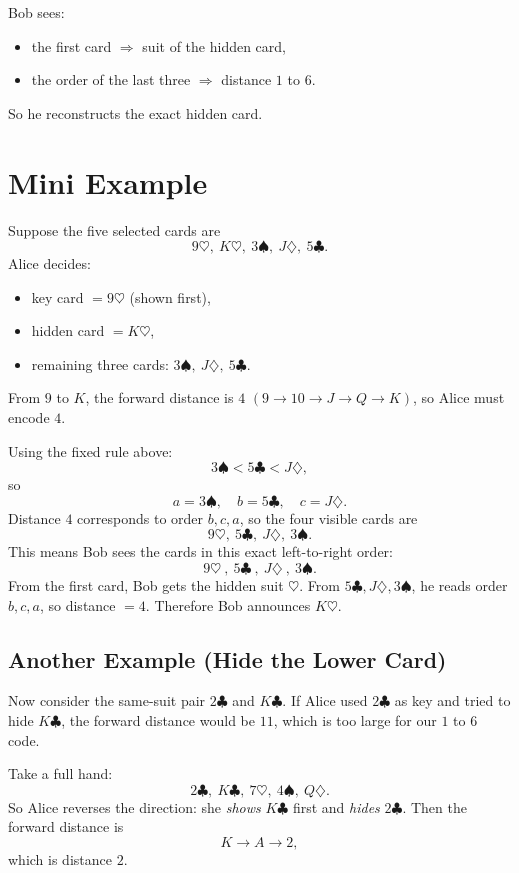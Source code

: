 Bob sees:
\begin{itemize}
  \item the first card \(\Rightarrow\) suit of the hidden card,
  \item the order of the last three \(\Rightarrow\) distance \(1\) to \(6\).
\end{itemize}
So he reconstructs the exact hidden card.

\section{Mini Example}
Suppose the five selected cards are
\[
9\heartsuit,\ K\heartsuit,\ 3\spadesuit,\ J\diamondsuit,\ 5\clubsuit.
\]
Alice decides:
\begin{itemize}
  \item key card \(=9\heartsuit\) (shown first),
  \item hidden card \(=K\heartsuit\),
  \item remaining three cards: \(3\spadesuit,\ J\diamondsuit,\ 5\clubsuit\).
\end{itemize}

From \(9\) to \(K\), the forward distance is \(4\)
\((9\to10\to J\to Q\to K)\), so Alice must encode \(4\).

Using the fixed rule above:
\[
3\spadesuit < 5\clubsuit < J\diamondsuit,
\]
so
\[
a=3\spadesuit,\quad b=5\clubsuit,\quad c=J\diamondsuit.
\]
Distance \(4\) corresponds to order \(b,c,a\), so the four visible cards are
\[
9\heartsuit,\ 5\clubsuit,\ J\diamondsuit,\ 3\spadesuit.
\]
This means Bob sees the cards in this exact left-to-right order:
\[
\boxed{9\heartsuit}\ ,\ \boxed{5\clubsuit}\ ,\ \boxed{J\diamondsuit}\ ,\ \boxed{3\spadesuit}.
\]
From the first card, Bob gets the hidden suit \(\heartsuit\). From
\(5\clubsuit,J\diamondsuit,3\spadesuit\), he reads order \(b,c,a\), so distance
\(=4\). Therefore Bob announces \(K\heartsuit\).

\subsection*{Another Example (Hide the Lower Card)}
Now consider the same-suit pair \(2\clubsuit\) and \(K\clubsuit\). If Alice used
\(2\clubsuit\) as key and tried to hide \(K\clubsuit\), the forward distance
would be \(11\), which is too large for our \(1\) to \(6\) code.

Take a full hand:
\[
2\clubsuit,\ K\clubsuit,\ 7\heartsuit,\ 4\spadesuit,\ Q\diamondsuit.
\]
So Alice reverses the direction: she \emph{shows} \(K\clubsuit\) first and
\emph{hides} \(2\clubsuit\). Then the forward distance is
\[
K\to A\to 2,
\]
which is distance \(2\).

